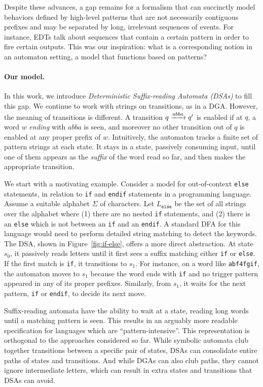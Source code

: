 Despite these advances, a gap remains for a formalism that can succinctly model behaviors defined by high-level patterns that are not necessarily contiguous prefixes and may be separated by long, irrelevant sequences of events. For instance, EDTs talk about sequences that contain a certain pattern in order to fire certain outputs. This was our inspiration: what is a corresponding notion in an automaton setting, a model that functions based on patterns? 

\paragraph*{Our model.} In this work, we introduce \emph{Deterministic Suffix-reading Automata (DSAs)} to fill this gap. We continue to work with strings on transitions, as in a DGA. However, the meaning of transitions is different. A transition $q \xrightarrow{abba} q'$ is enabled if at $q$, a word $w$ \emph{ending} with $abba$ is seen, and moreover no other transition out of $q$ is enabled at any proper prefix of $w$. Intuitively, the automaton tracks a finite set of pattern strings at each state. It stays in a state, passively consuming input, until one of them appears as the \emph{suffix} of the word read so far, and then makes the appropriate transition.

We start with a motivating example. Consider a model for out-of-context \texttt{else} statements, in relation to \texttt{if} and \texttt{endif} statements in a programming language. Assume a suitable alphabet $\Sigma$ of characters. Let $L_{\texttt{else}}$ be the set of all strings over the alphabet where (1) there are no nested \texttt{if} statements, and (2) there is an \texttt{else} which is not between an \texttt{if} and an \texttt{endif}. A standard DFA for this language would need to perform detailed string matching to detect the keywords. The DSA, shown in Figure~\ref{fig:if-else}, offers a more direct abstraction. At state $s_0$, it passively reads letters until it first sees a suffix matching either \texttt{if} or \texttt{else}. If the first match is \texttt{if}, it transitions to $s_1$. For instance, on a word like \texttt{abf4fgif}, the automaton moves to $s_1$ because the word ends with \texttt{if} and no trigger pattern appeared in any of its proper prefixes. Similarly, from $s_1$, it waits for the next pattern, \texttt{if} or \texttt{endif}, to decide its next move.

Suffix-reading automata have the ability to wait at a state, reading long words until a matching pattern is seen. This results in an arguably more readable specification for languages which are ``pattern-intensive''. This representation is orthogonal to the approaches considered so far. While symbolic automata club together transitions between a specific pair of states, DSAs can consolidate entire paths of states and transitions. And while DGAs can also club paths, they cannot ignore intermediate letters, which can result in extra states and transitions that DSAs can avoid.









